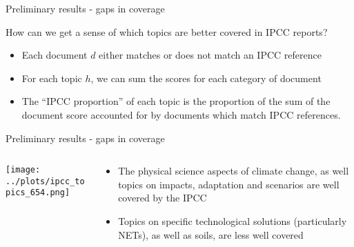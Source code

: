 \documentclass[9pt]{beamer}
\begin{document}
%
%
%
%
%

\begin{frame}{Preliminary results - gaps in coverage}

How can we get a sense of which topics are better covered in IPCC reports?

\begin{itemize}
	\item Each document \(d\) either matches or does not match an IPCC reference
	\item For each topic \(h\), we can sum the scores for each category of document
	\item The ``IPCC proportion'' of each topic is the proportion of the sum of the document score accounted for by documents which match IPCC references.
\end{itemize}



\end{frame}

\begin{frame}{Preliminary results - gaps in coverage}

\begin{columns}
	\begin{column}{0.7\linewidth}
		\begin{center}
			\texttt{[image: ../plots/ipcc\_topics\_654.png]}
		\end{center}
	\end{column}
	\begin{column}{0.3\linewidth}
		\begin{center}
			\begin{itemize}
				\item The physical science aspects of climate change, as well topics on impacts, adaptation and scenarios are well covered by the IPCC
				\item Topics on specific technological solutions (particularly NETs), as well as soils, are less well covered
			\end{itemize}
		\end{center}
	\end{column}
\end{columns}

\end{frame}
\end{document}
